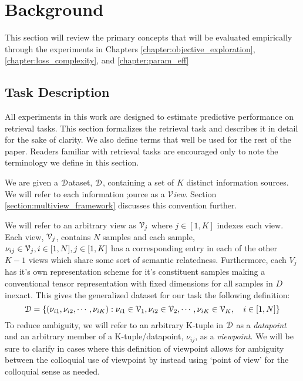 \chapter{Background}
This section will review the primary concepts that will be evaluated empirically through the experiments in Chapters \ref{chapter:objective_exploration}, \ref{chapter:loss_complexity}, and \ref{chapter:param_eff}

\section{Task Description}
\label{section:task_defs}
All experiments in this work are designed to estimate predictive performance on retrieval tasks.
This section formalizes the retrieval task and describes it in detail for the sake of clarity.
We also define terms that well be used for the rest of the paper.
Readers familiar with retrieval tasks are encouraged only to note the terminology we define in this section.

We are given a \underline{${\D}$}ataset, $\D$, containing a set of $K$ distinct information sources. 
We will refer to each information ;ource as a \textit{\underline{$\mathcal{V}$}iew}.
Section \ref{section:multiview_framework} discusses this convention further.

We will refer to an arbitrary view as $\V[j]$ where $j\in[1,K]$ indexes each view.
Each view, $\V[j]$,  contains $N$ samples and each sample, $\nu_{ij} \in \V[j], i\in [1,N], j\in[1,K]$ has a corresponding entry in each of the other $K-1$ views which share some sort of semantic relatedness.
Furthermore, each $V_j$ has it's own representation scheme for it's constituent samples making a conventional tensor representation with fixed dimensions for all samples in $D$ inexact.
This gives the generalized dataset for our task the following definition:
\begin{equation*}
    \D = \{(\nu_{i1}, \nu_{i2}, \cdots, \nu_{iK}) : \nu_{i1} \in \V[1], \nu_{i2} \in \V[2], \cdots, \nu_{iK} \in \V[K], \quad i \in [1,N]\}
\end{equation*}
To reduce ambiguity, we will refer to an arbitrary K-tuple in $\D$ as a \textit{datapoint} and an arbitrary member of a K-tuple/datapoint, $\nu_{ij}$, as a \textit{viewpoint}. 
We will be sure to clarify in cases where this definition of viewpoint allows for ambiguity between the colloquial use of viewpoint by instead using `point of view' for the colloquial sense as needed.

